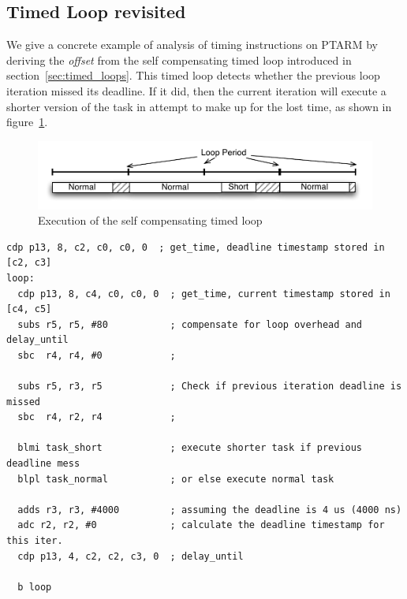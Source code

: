 \subsection{Timed Loop revisited}
\label{sec:timed_loop_revisited}
We give a concrete example of analysis of timing instructions on PTARM by deriving the \emph{offset} from the self compensating timed loop introduced in section~\ref{sec:timed_loops}.
This timed loop detects whether the previous loop iteration missed its deadline. 
If it did, then the current iteration will execute a shorter version of the task in attempt to make up for the lost time, as shown in figure~\ref{fig:self_compensating_loop_timing}.  
\begin{figure}[h]
  \vspace{-3mm}
  \begin{center}
    \includegraphics[scale=.7]{figs/self_compensating_loop_timing}
  \end{center}
  \vspace{-3mm}
  \caption{Execution of the self compensating timed loop}
  \label{fig:self_compensating_loop_timing}
\end{figure}
\vspace{-8mm}
\begin{lstlisting}[float=h, label=lst:timed_loop_compensate_revisit,caption=Timed loops with compensation revisited]
  cdp p13, 8, c2, c0, c0, 0  ; get_time, deadline timestamp stored in [c2, c3]
loop:
  cdp p13, 8, c4, c0, c0, 0  ; get_time, current timestamp stored in [c4, c5]
  subs r5, r5, #80           ; compensate for loop overhead and delay_until 
  sbc  r4, r4, #0            ; 

  subs r5, r3, r5            ; Check if previous iteration deadline is missed
  sbc  r4, r2, r4            ; 

  blmi task_short            ; execute shorter task if previous deadline mess 
  blpl task_normal           ; or else execute normal task 
  
  adds r3, r3, #4000         ; assuming the deadline is 4 us (4000 ns)
  adc r2, r2, #0             ; calculate the deadline timestamp for this iter.
  cdp p13, 4, c2, c2, c3, 0  ; delay_until
   
  b loop
\end{lstlisting}


